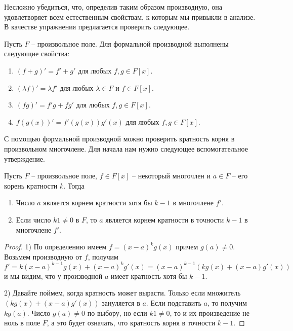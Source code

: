 Несложно убедиться, что, определив таким образом производную, она удовлетворяет всем естественным свойствам, к которым мы привыкли в анализе.
В качестве упражнения предлагается проверить следующее.

\begin{claim}
Пусть $F$ -- произвольное поле.
Для формальной производной выполнены следующие свойства:
\begin{enumerate}
\item $(f + g)' = f' + g'$ для любых $f,g\in F[x]$.

\item $(\lambda f )' = \lambda f'$ для любых $\lambda\in F$ и $f\in F[x]$.

\item $(fg)' = f' g + fg'$ для любых $f,g\in F[x]$.

\item $f(g(x))' = f'(g(x)) g'(x)$ для любых $f,g\in F[x]$.
\end{enumerate}
\end{claim}


С помощью формальной производной можно проверить кратность корня в произвольном многочлене.
Для начала нам нужно следующее вспомогательное утверждение.

\begin{claim}
Пусть $F$ -- произвольное поле, $f\in F[x]$ -- некоторый многочлен и $a\in F$ -- его корень кратности $k$.
Тогда 
\begin{enumerate}
\item Число $a$ является корнем кратности хотя бы $k-1$ в многочлене $f'$.

\item Если число $k 1 \neq 0$ в $F$, то $a$ является корнем кратности в точности $k - 1$ в многочлене $f'$.
\end{enumerate}
\end{claim}
\begin{proof}
1) По определению имеем $f = (x - a)^k g(x)$ причем $g(a) \neq 0$.
Возьмем производную от $f$, получим
\[
f' = k(x-a)^{k-1}g(x) + (x-a)^k g'(x) = (x-a)^{k-1}(kg(x) + (x-a)g'(x))
\]
и мы видим, что у производной $a$ имеет кратность хотя бы $k-1$.


2) Давайте поймем, когда кратность может вырасти.
Только если множитель $(kg(x) + (x-a)g'(x))$ зануляется в $a$.
Если подставить $a$, то получим $kg(a)$.
Число $g(a)\neq 0$ по выбору, но если $k 1\neq 0$, то и их произведение не ноль в поле $F$, а это будет означать, что кратность корня в точности $k - 1$.
\end{proof}

